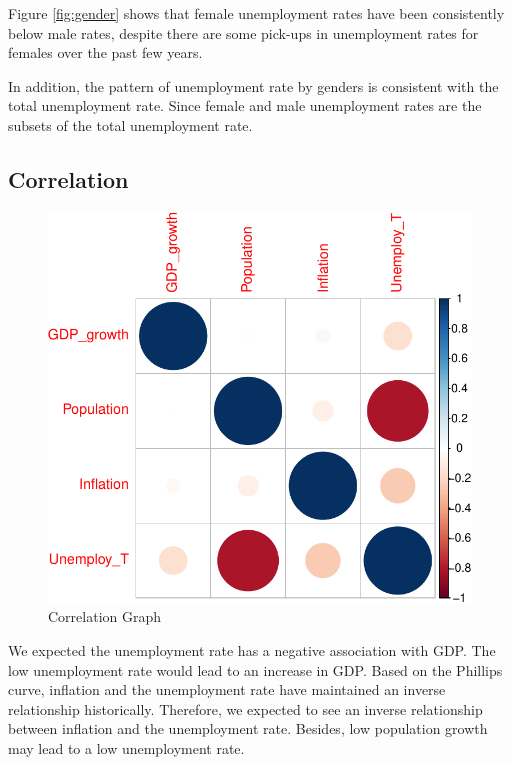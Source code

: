 \documentclass[11pt,a4paper,]{article}
\begin{document}
Figure \ref{fig:gender} shows that female unemployment rates have been consistently below male rates, despite there are some pick-ups in unemployment rates for females over the past few years.

In addition, the pattern of unemployment rate by genders is consistent with the total unemployment rate. Since female and male unemployment rates are the subsets of the total unemployment rate.

\subsection{Correlation}

\begin{figure}[H]

{\centering \includegraphics{Figures/cor-1} 

}

\caption{Correlation Graph}\label{fig:cor}
\end{figure}

We expected the unemployment rate has a negative association with GDP. The low unemployment rate would lead to an increase in GDP. Based on the Phillips curve, inflation and the unemployment rate have maintained an inverse relationship historically. Therefore, we expected to see an inverse relationship between inflation and the unemployment rate. Besides, low population growth may lead to a low unemployment rate.
\end{document}
